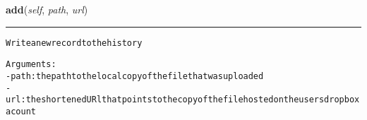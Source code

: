     \label{lib:history:History:add}

    \vspace{0.5ex}

\hspace{.8\funcindent}\begin{boxedminipage}{\funcwidth}

    \raggedright \textbf{add}(\textit{self}, \textit{path}, \textit{url})

    \vspace{-1.5ex}

    \rule{\textwidth}{0.5\fboxrule}
\setlength{\parskip}{2ex}
\begin{alltt}

Write a new record to the history

Arguments:
- path: the path to the local copy of the file that was uploaded
- url: the shortened URl that points to the copy of the file hosted on the users dropbox acount
\end{alltt}

\setlength{\parskip}{1ex}
    \end{boxedminipage}

